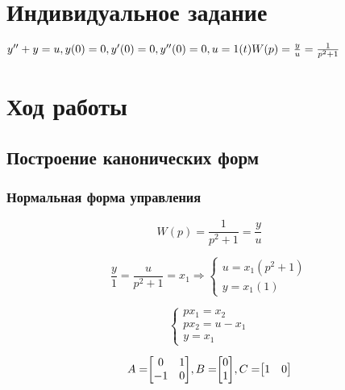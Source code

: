 \documentclass[14pt,a4paper,report]{report}
\begin{document}
\section{Индивидуальное задание}

$
\\
y''+ y=u, y(0)=0, y'(0)=0,y''(0)=0, u=1(t)\\\\
W(p)=\frac{y}{u}=\frac{1}{p^2+1}
$

\section{Ход работы}

\subsection{Построение канонических форм}

\subsubsection{Нормальная форма управления}

\begin{equation*}
\text{$W(p)=\frac{1}{p^2+1}=\frac{y}{u}$}
\end{equation*}

\begin{equation*}
\text{$\frac{y}{1}=\frac{u}{p^2+1}=x_1$}
\Longrightarrow
\begin{cases}
	\text{$u=x_1(p^2+1)$} \\
	\text{$y=x_1(1)$}
\end{cases}
\end{equation*}

\begin{equation*}
\begin{cases}
	\text{$px_1=x_2$} \\
	\text{$px_2=u-x_1$}\\
	\text{$y=x_1$}
\end{cases}
\end{equation*}

\begin{equation*}
\text{$A=$}
\text{$
\begin{bmatrix}
0 & 1 \\
-1 & 0 \\
\end{bmatrix}
$}
\text{$, B=$}
\text{$
\begin{bmatrix}
0 \\
1 \\
\end{bmatrix}
$}
\text{$, C=$}
\text{$
\begin{bmatrix}
1 & 0 \\
\end{bmatrix}
$}
\end{equation*}
\end{document}
